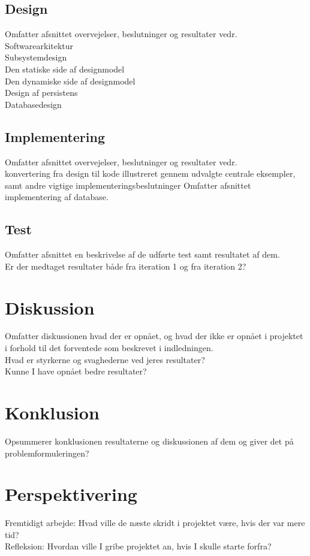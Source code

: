 \documentclass[12pt]{article}
\begin{document}
\subsection{Design}
Omfatter afsnittet overvejelser, beslutninger og resultater vedr.\\
Softwarearkitektur\\
Subsystemdesign\\
Den statiske side af designmodel\\
Den dynamiske side af designmodel\\
Design af persistens\\
Databasedesign\\
\subsection{Implementering}
Omfatter afsnittet overvejelser, beslutninger og resultater vedr.\\  konvertering fra design til kode illustreret gennem udvalgte centrale eksempler, samt andre vigtige implementeringsbeslutninger
Omfatter afsnittet implementering af database.
\subsection{Test}
Omfatter afsnittet en beskrivelse af de udførte test samt resultatet af dem.\\
Er der medtaget resultater både fra iteration 1 og fra iteration 2?\\

\section{Diskussion}
Omfatter diskussionen hvad der er opnået, og hvad der ikke er opnået i projektet i forhold til det forventede som beskrevet i indledningen. \\
Hvad er styrkerne og svaghederne ved jeres resultater?\\
Kunne I have opnået bedre resultater?\\

\section{Konklusion}
Opsummerer konklusionen resultaterne og diskussionen af dem og giver det på problemformuleringen? \\
\section{Perspektivering}
Fremtidigt arbejde: Hvad ville de næste skridt i projektet være, hvis der var mere tid?\\
Refleksion: Hvordan ville I gribe projektet an, hvis I skulle starte forfra? 
\end{document}
